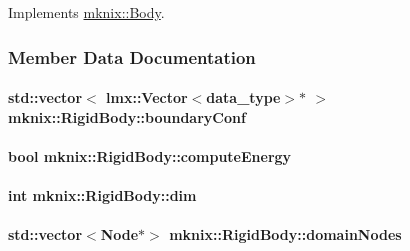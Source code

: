 Implements \hyperlink{classmknix_1_1_body_ada574d09e98568156185eb7eef398c8f}{mknix\-::\-Body}.



\subsubsection{Member Data Documentation}
\hypertarget{classmknix_1_1_rigid_body_a36a9d72e5203dc087748cb7fddafee71}{
\paragraph[{boundary\-Conf}]{\setlength{\rightskip}{0pt plus 5cm}std\-::vector$<$ lmx\-::\-Vector$<${\bf data\-\_\-type}$>$$\ast$ $>$ mknix\-::\-Rigid\-Body\-::boundary\-Conf\hspace{0.3cm}{\ttfamily [protected]}}}\label{classmknix_1_1_rigid_body_a36a9d72e5203dc087748cb7fddafee71}
\hypertarget{classmknix_1_1_rigid_body_a569b96d28e2b0c008240a001c3a87eb3}{
\paragraph[{compute\-Energy}]{\setlength{\rightskip}{0pt plus 5cm}bool mknix\-::\-Rigid\-Body\-::compute\-Energy\hspace{0.3cm}{\ttfamily [protected]}}}\label{classmknix_1_1_rigid_body_a569b96d28e2b0c008240a001c3a87eb3}
\hypertarget{classmknix_1_1_rigid_body_abdb2cd12b0d4c08b6ba7a7c3fd84b2e2}{
\paragraph[{dim}]{\setlength{\rightskip}{0pt plus 5cm}int mknix\-::\-Rigid\-Body\-::dim\hspace{0.3cm}{\ttfamily [protected]}}}\label{classmknix_1_1_rigid_body_abdb2cd12b0d4c08b6ba7a7c3fd84b2e2}
\hypertarget{classmknix_1_1_rigid_body_a278b4b0d27aaecfae2be58c8a9275a8c}{
\paragraph[{domain\-Nodes}]{\setlength{\rightskip}{0pt plus 5cm}std\-::vector$<${\bf Node}$\ast$$>$ mknix\-::\-Rigid\-Body\-::domain\-Nodes\hspace{0.3cm}{\ttfamily [protected]}}}\label{classmknix_1_1_rigid_body_a278b4b0d27aaecfae2be58c8a9275a8c}
